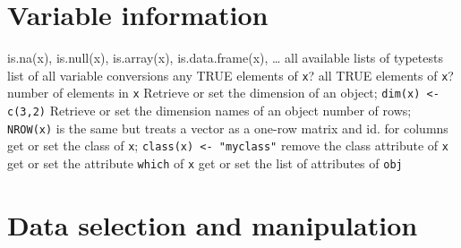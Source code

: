 {\section{Variable information}{{\smalltt is.na(x), is.null(x), is.array(x), is.data.frame(x), \ldots}}
	{all available lists of typetests}
	{list of all variable conversions}
	{any TRUE elements of {\tt x}?}
	{all TRUE elements of {\tt x}?}
	{ number of elements in {\tt x}}
	{Retrieve or set the dimension of an object; {\tt dim(x) <- c(3,2)}}
	{Retrieve or set the dimension names of an object}
	{number of rows; {\tt NROW(x)} is the same but treats a vector as a one-row matrix}
	{and}
	{id. for columns}
	{get or set the class of {\tt x}; {\tt class(x) <- "myclass"}}
	{remove the class attribute of {\tt x}}
	{get or set the attribute {\tt which} of {\tt x}}
	{get or set the list of attributes of {\tt obj}}

\section{Data selection and manipulation}{}

}
